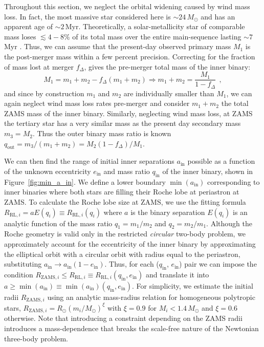 \documentclass{aa}
\DeclareRobustCommand{\Figref}[1]{Figure~\ref{#1}}
\begin{document}
Throughout this section, we neglect the orbital widening caused by
wind mass loss. In fact, the most massive star considered here is
$\sim24\,M_\odot$ and has an apparent age of $\sim2$\,Myr.
Theoretically, a solar-metallicity star of comparable mass loses
$\lesssim 4-8\%$ of its total mass over the entire main-sequence
lasting $\sim 7$\,Myr \citep{renzo:17}. Thus, we can assume that the
present-day observed primary mass $M_1$ is the post-merger mass within
a few percent precision. Correcting for the fraction of mass
lost at merger $f_\Delta$, gives the pre-merger total mass of the inner
binary:
\begin{equation}
  \label{eq:mtot_in}
  M_1 = m_1+m_2 - f_\Delta(m_1+m_2) \Rightarrow m_1+m_2 = \frac{M_1}{1-f_\Delta} \ \ ,
\end{equation}
and since by construction $m_1$ and $m_2$ are individually smaller
than $M_1$, we can again neglect wind mass loss rates pre-merger and
consider $m_1+m_2$ the total ZAMS mass of the
inner binary. Similarly, neglecting wind mass loss, at ZAMS the
tertiary star has a very similar mass as the present day secondary mass
$m_3=M_2$. Thus the outer binary mass ratio is known
$q_\mathrm{out}=m_3/(m_1+m_2)= M_2(1-f_\Delta)/M_1$.

We can then find the range of initial inner separations
$a_\mathrm{in}$ possible as a function of the unknown eccentricity
$e_\mathrm{in}$ and mass ratio $q_\mathrm{in}$ of the inner binary,
shown in \Figref{fig:min_a_in}. We define a lower boundary
$\min(a_\mathrm{in})$ corresponding to inner binaries where both stars
are filling their Roche lobe at periastron at ZAMS. To calculate the
Roche lobe size at ZAMS, we use the \cite{eggleton:83} fitting formula
$R_{\mathrm{RL},i} = a E(q_i) \equiv R_{\mathrm{RL},i}(q_i)$ where $a$
is the binary separation $E(q_i)$ is an analytic function of the mass
ratio $q_1=m_1/m_2$ and $q_2=m_2/m_1$. Although the Roche geometry is
valid only in the restricted \emph{circular} two-body problem, we approximately
account for the eccentricity of the inner binary by approximating the
elliptical orbit with a circular orbit with radius equal to the
periastron, substituting
$a_\mathrm{in}\rightarrow a_\mathrm{in}(1-e_\mathrm{in})$. Thus, for
each ($q_\mathrm{in}$, $e_\mathrm{in}$) pair we can impose the condition
$R_{\mathrm{ZAMS},i} \leq R_{\mathrm{RL}, i}\equiv R_{\mathrm{RL}, i}(q_\mathrm{in}, e_\mathrm{in})$
and translate
it into
$a\geq \min(a_\mathrm{in}) \equiv \min(a_\mathrm{in})(q_\mathrm{in},e_\mathrm{in})$.
For simplicity, we estimate the initial radii $R_{\mathrm{ZAMS}, i}$
using an analytic mass-radius relation for homogeneous polytropic
stars, $R_{\mathrm{ZAMS} ,i}= R_\odot(m_i/M_\odot)^{\xi}$ with
$\xi=0.9$ for $M_i<1.4\,M_\odot$ and $\xi=0.6$ otherwise. Note that
introducing a constraint depending on the ZAMS radii introduces a
mass-dependence that breaks the scale-free nature of the Newtonian
three-body problem.
\end{document}
